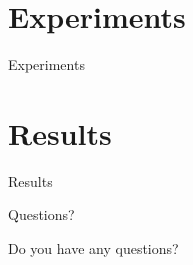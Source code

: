 \documentclass[10pt]{beamer}
\begin{document}
\section{Experiments}
\begin{frame}{Experiments}

\centering
\begin{figure}[h]

\end{figure}

\end{frame}

\section{Results}
\begin{frame}{Results}

\end{frame}










\begin{frame}{Questions?}

Do you have any questions?

%
%
\end{frame}
\end{document}

